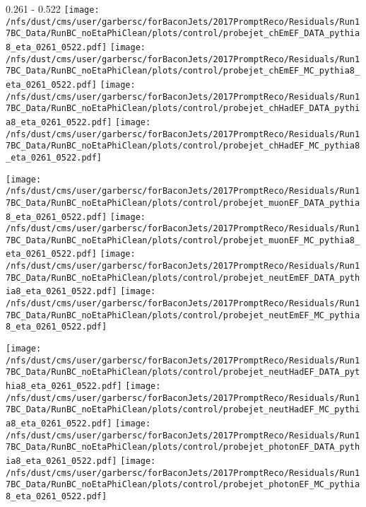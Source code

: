 \documentclass[t,compress]{beamer}
\begin{document}
\begin{frame}{0.261 - 0.522}
	\texttt{[image: /nfs/dust/cms/user/garbersc/forBaconJets/2017PromptReco/Residuals/Run17BC\_Data/RunBC\_noEtaPhiClean/plots/control/probejet\_chEmEF\_DATA\_pythia8\_eta\_0261\_0522.pdf]}
	\texttt{[image: /nfs/dust/cms/user/garbersc/forBaconJets/2017PromptReco/Residuals/Run17BC\_Data/RunBC\_noEtaPhiClean/plots/control/probejet\_chEmEF\_MC\_pythia8\_eta\_0261\_0522.pdf]}
	\texttt{[image: /nfs/dust/cms/user/garbersc/forBaconJets/2017PromptReco/Residuals/Run17BC\_Data/RunBC\_noEtaPhiClean/plots/control/probejet\_chHadEF\_DATA\_pythia8\_eta\_0261\_0522.pdf]}
	\texttt{[image: /nfs/dust/cms/user/garbersc/forBaconJets/2017PromptReco/Residuals/Run17BC\_Data/RunBC\_noEtaPhiClean/plots/control/probejet\_chHadEF\_MC\_pythia8\_eta\_0261\_0522.pdf]}
\newline

\vspace{-0.65cm}
	\texttt{[image: /nfs/dust/cms/user/garbersc/forBaconJets/2017PromptReco/Residuals/Run17BC\_Data/RunBC\_noEtaPhiClean/plots/control/probejet\_muonEF\_DATA\_pythia8\_eta\_0261\_0522.pdf]}
	\texttt{[image: /nfs/dust/cms/user/garbersc/forBaconJets/2017PromptReco/Residuals/Run17BC\_Data/RunBC\_noEtaPhiClean/plots/control/probejet\_muonEF\_MC\_pythia8\_eta\_0261\_0522.pdf]}
	\texttt{[image: /nfs/dust/cms/user/garbersc/forBaconJets/2017PromptReco/Residuals/Run17BC\_Data/RunBC\_noEtaPhiClean/plots/control/probejet\_neutEmEF\_DATA\_pythia8\_eta\_0261\_0522.pdf]}
	\texttt{[image: /nfs/dust/cms/user/garbersc/forBaconJets/2017PromptReco/Residuals/Run17BC\_Data/RunBC\_noEtaPhiClean/plots/control/probejet\_neutEmEF\_MC\_pythia8\_eta\_0261\_0522.pdf]}
\newline

\vspace{-0.65cm}
	\texttt{[image: /nfs/dust/cms/user/garbersc/forBaconJets/2017PromptReco/Residuals/Run17BC\_Data/RunBC\_noEtaPhiClean/plots/control/probejet\_neutHadEF\_DATA\_pythia8\_eta\_0261\_0522.pdf]}
	\texttt{[image: /nfs/dust/cms/user/garbersc/forBaconJets/2017PromptReco/Residuals/Run17BC\_Data/RunBC\_noEtaPhiClean/plots/control/probejet\_neutHadEF\_MC\_pythia8\_eta\_0261\_0522.pdf]}
	\texttt{[image: /nfs/dust/cms/user/garbersc/forBaconJets/2017PromptReco/Residuals/Run17BC\_Data/RunBC\_noEtaPhiClean/plots/control/probejet\_photonEF\_DATA\_pythia8\_eta\_0261\_0522.pdf]}
	\texttt{[image: /nfs/dust/cms/user/garbersc/forBaconJets/2017PromptReco/Residuals/Run17BC\_Data/RunBC\_noEtaPhiClean/plots/control/probejet\_photonEF\_MC\_pythia8\_eta\_0261\_0522.pdf]}
\end{frame}
\end{document}
